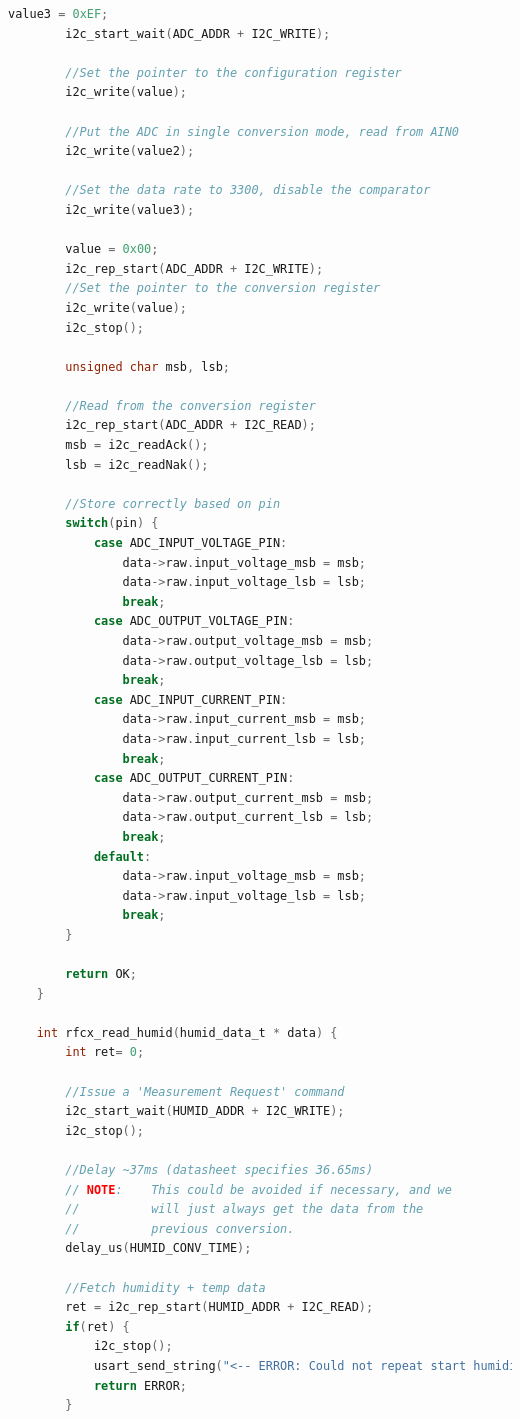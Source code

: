 \documentclass{article}
\numberwithin{figure}{section}
\numberwithin{equation}{section}
\begin{document}
{\begin{lstlisting}[language=C,label=lst:rfcx-i2c.c,caption=rfcx-i2c.c]
        value3 = 0xEF;
        i2c_start_wait(ADC_ADDR + I2C_WRITE);

        //Set the pointer to the configuration register
        i2c_write(value);

        //Put the ADC in single conversion mode, read from AIN0
        i2c_write(value2);

        //Set the data rate to 3300, disable the comparator
        i2c_write(value3);

        value = 0x00;
        i2c_rep_start(ADC_ADDR + I2C_WRITE);
        //Set the pointer to the conversion register
        i2c_write(value);
        i2c_stop();

        unsigned char msb, lsb;

        //Read from the conversion register
        i2c_rep_start(ADC_ADDR + I2C_READ);
        msb = i2c_readAck();
        lsb = i2c_readNak();

        //Store correctly based on pin
        switch(pin) {
            case ADC_INPUT_VOLTAGE_PIN:
                data->raw.input_voltage_msb = msb;
                data->raw.input_voltage_lsb = lsb;
                break;
            case ADC_OUTPUT_VOLTAGE_PIN:
                data->raw.output_voltage_msb = msb;
                data->raw.output_voltage_lsb = lsb;
                break;
            case ADC_INPUT_CURRENT_PIN:
                data->raw.input_current_msb = msb;
                data->raw.input_current_lsb = lsb;
                break;
            case ADC_OUTPUT_CURRENT_PIN:
                data->raw.output_current_msb = msb;
                data->raw.output_current_lsb = lsb;
                break;
            default:
                data->raw.input_voltage_msb = msb;
                data->raw.input_voltage_lsb = lsb;
                break;
        }

        return OK;
    }

    int rfcx_read_humid(humid_data_t * data) {
        int ret= 0;

        //Issue a 'Measurement Request' command
        i2c_start_wait(HUMID_ADDR + I2C_WRITE);
        i2c_stop();

        //Delay ~37ms (datasheet specifies 36.65ms)
        // NOTE:    This could be avoided if necessary, and we
        //          will just always get the data from the
        //          previous conversion.
        delay_us(HUMID_CONV_TIME);

        //Fetch humidity + temp data
        ret = i2c_rep_start(HUMID_ADDR + I2C_READ);
        if(ret) {
            i2c_stop();
            usart_send_string("<-- ERROR: Could not repeat start humidity sensor-->\r\n");
            return ERROR;
        }


\end{lstlisting}}
\end{document}
